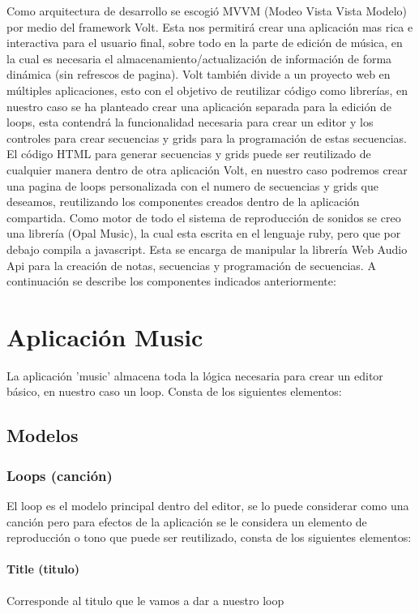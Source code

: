 Como arquitectura de desarrollo se escogió MVVM (Modeo Vista Vista Modelo) por
medio del framework Volt.
Esta nos permitirá crear una aplicación mas rica e interactiva para
el usuario final, sobre todo en la parte de edición de música, en la cual
es necesaria el almacenamiento/actualización de información de forma
dinámica (sin refrescos de pagina).
Volt también divide a un proyecto web en múltiples aplicaciones, esto con
el objetivo de reutilizar código como librerías, en nuestro caso se ha
planteado crear una aplicación separada para la edición de loops, esta
contendrá la funcionalidad necesaria para crear un editor y los controles para
crear secuencias y grids para la programación de estas secuencias. El código
HTML para generar secuencias y grids puede ser reutilizado de cualquier manera
dentro de otra aplicación Volt, en nuestro caso podremos crear una pagina de loops
personalizada con el numero de secuencias y grids que deseamos, reutilizando los
componentes creados dentro de la aplicación compartida.
Como motor de todo el sistema de reproducción de sonidos se creo una librería
(Opal Music), la cual esta escrita en el lenguaje ruby, pero que por debajo
compila a javascript. Esta se encarga de manipular la librería Web Audio
Api para la creación de notas, secuencias y programación de secuencias.
A continuación se describe los componentes indicados anteriormente:

\section{Aplicación Music}

La aplicación 'music' almacena toda la lógica necesaria para crear
un editor básico, en nuestro caso un loop. Consta de los siguientes elementos:

\subsection{Modelos}
\subsubsection{Loops (canción)}
El loop es el modelo principal dentro del editor, se lo puede considerar como
una canción pero para efectos de la aplicación se le considera un elemento de
reproducción o tono que puede ser reutilizado, consta de los siguientes elementos:
\paragraph{Title (titulo)}
Corresponde al titulo que le vamos a dar a nuestro loop
